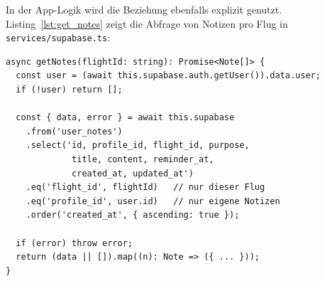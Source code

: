 
In der App-Logik wird die Beziehung ebenfalls explizit genutzt.
Listing~\ref{lst:get_notes} zeigt die Abfrage von Notizen pro Flug in
\texttt{services/supabase.ts}:

\begin{lstlisting}[style=skyline-ts,
  caption={Flugbezogene Notizen-Abfrage mit \texttt{profile\_id}-Filter
           (services/supabase.ts)},
  label={lst:get_notes}]
async getNotes(flightId: string): Promise<Note[]> {
  const user = (await this.supabase.auth.getUser()).data.user;
  if (!user) return [];

  const { data, error } = await this.supabase
    .from('user_notes')
    .select('id, profile_id, flight_id, purpose,
             title, content, reminder_at,
             created_at, updated_at')
    .eq('flight_id', flightId)   // nur dieser Flug
    .eq('profile_id', user.id)   // nur eigene Notizen
    .order('created_at', { ascending: true });

  if (error) throw error;
  return (data || []).map((n): Note => ({ ... }));
}
\end{lstlisting}


